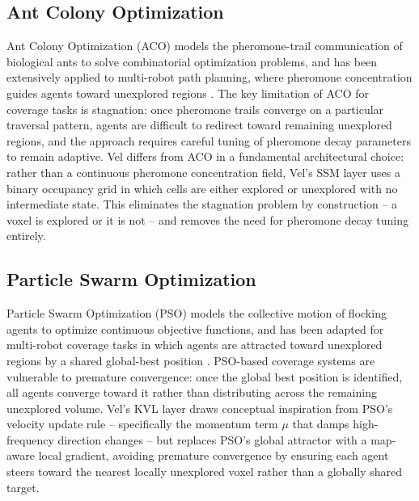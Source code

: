 \documentclass[10pt,journal]{IEEEtran}
\begin{document}
\subsection{Ant Colony Optimization}
Ant Colony Optimization (ACO) models the pheromone-trail communication of
biological ants to solve combinatorial optimization problems, and has been
extensively applied to multi-robot path planning, where pheromone
concentration guides agents toward unexplored regions \cite{dorigo2006ant}.
The key limitation of ACO for coverage tasks is stagnation: once pheromone
trails converge on a particular traversal pattern, agents are difficult to
redirect toward remaining unexplored regions, and the approach requires
careful tuning of pheromone decay parameters to remain adaptive. Vel
differs from ACO in a fundamental architectural choice: rather than a
continuous pheromone concentration field, Vel's SSM layer uses a binary
occupancy grid in which cells are either explored or unexplored with no
intermediate state. This eliminates the stagnation problem by construction
-- a voxel is explored or it is not -- and removes the need for pheromone
decay tuning entirely.

\subsection{Particle Swarm Optimization}
Particle Swarm Optimization (PSO) models the collective motion of flocking
agents to optimize continuous objective functions, and has been adapted for
multi-robot coverage tasks in which agents are attracted toward unexplored
regions by a shared global-best position \cite{banks2007}. PSO-based
coverage systems are vulnerable to premature convergence: once the global
best position is identified, all agents converge toward it rather than
distributing across the remaining unexplored volume. Vel's KVL layer draws
conceptual inspiration from PSO's velocity update rule -- specifically the
momentum term $\mu$ that damps high-frequency direction changes -- but
replaces PSO's global attractor with a map-aware local gradient, avoiding
premature convergence by ensuring each agent steers toward the nearest
locally unexplored voxel rather than a globally shared target.
\end{document}
